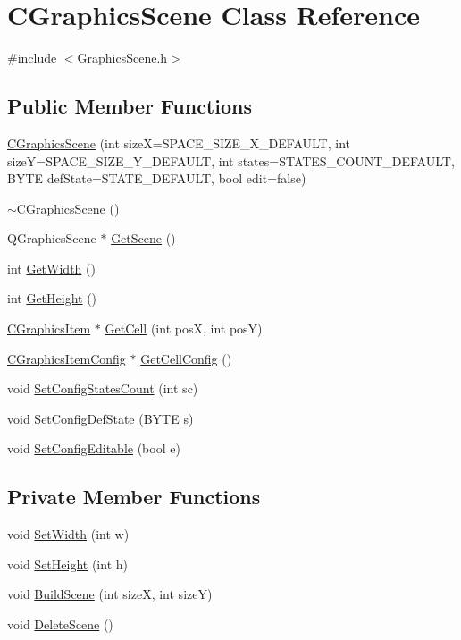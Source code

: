 \hypertarget{classCGraphicsScene}{
\section{CGraphicsScene Class Reference}
\label{classCGraphicsScene}
}


{\ttfamily \#include $<$GraphicsScene.h$>$}\subsection*{Public Member Functions}
\begin{DoxyCompactItemize}
\item 
\hyperlink{classCGraphicsScene_a41c5f62f60a2eb61d473d8cfa4455c36}{CGraphicsScene} (int sizeX=SPACE\_\-SIZE\_\-X\_\-DEFAULT, int sizeY=SPACE\_\-SIZE\_\-Y\_\-DEFAULT, int states=STATES\_\-COUNT\_\-DEFAULT, BYTE defState=STATE\_\-DEFAULT, bool edit=false)
\item 
\hyperlink{classCGraphicsScene_a738153c68b9a91316fe4ec3b2d659f59}{$\sim$CGraphicsScene} ()
\item 
QGraphicsScene $\ast$ \hyperlink{classCGraphicsScene_acee66ed8d6c2e4585bcb80a872bbc75c}{GetScene} ()
\item 
int \hyperlink{classCGraphicsScene_a446b3dd9434dbdee43bf303f4511c919}{GetWidth} ()
\item 
int \hyperlink{classCGraphicsScene_ad415c0259dffc4bd72fb59bc1ea23d36}{GetHeight} ()
\item 
\hyperlink{classCGraphicsItem}{CGraphicsItem} $\ast$ \hyperlink{classCGraphicsScene_a29048e6dda1ce0082b8499b5d2e48910}{GetCell} (int posX, int posY)
\item 
\hyperlink{classCGraphicsItemConfig}{CGraphicsItemConfig} $\ast$ \hyperlink{classCGraphicsScene_a97b82b2ded17f05c2cf3b3e110662ce4}{GetCellConfig} ()
\item 
void \hyperlink{classCGraphicsScene_a22e3319fb3557f244c7a8c6eca0bfb06}{SetConfigStatesCount} (int sc)
\item 
void \hyperlink{classCGraphicsScene_aa3507a9175e715ef27b7fb066a5c7bab}{SetConfigDefState} (BYTE s)
\item 
void \hyperlink{classCGraphicsScene_a371dfa6cc547d24db00756048fe065b9}{SetConfigEditable} (bool e)
\end{DoxyCompactItemize}
\subsection*{Private Member Functions}
\begin{DoxyCompactItemize}
\item 
void \hyperlink{classCGraphicsScene_a7589adb1bd0809ac71f68f034d32fa5b}{SetWidth} (int w)
\item 
void \hyperlink{classCGraphicsScene_ac8674f95fe4430eca696633f674ce965}{SetHeight} (int h)
\item 
void \hyperlink{classCGraphicsScene_ad609155f1d601db1dd39eb4c6fbfb3c8}{BuildScene} (int sizeX, int sizeY)
\item 
void \hyperlink{classCGraphicsScene_ad718ef16c3756aaa66eacd4686e45202}{DeleteScene} ()
\end{DoxyCompactItemize}

